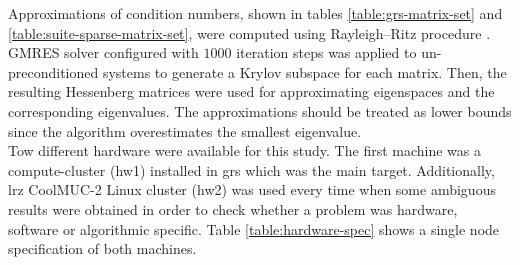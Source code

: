 Approximations of condition numbers, shown in tables \ref{table:grs-matrix-set} and \ref{table:suite-sparse-matrix-set},  were computed using Rayleigh–Ritz procedure \cite{rayleigh-ritz-procedure}. GMRES solver configured with $1000$ iteration steps was applied to un-preconditioned systems to generate a Krylov subspace for each matrix. Then, the resulting Hessenberg matrices were used for approximating eigenspaces and the corresponding eigenvalues. The approximations should be treated as lower bounds since the algorithm overestimates the smallest eigenvalue.\\




Tow different hardware were available for this study. The first machine was a compute-cluster (\gls{hw1}) installed in \gls{grs} which was the main target. Additionally, \gls{lrz} CoolMUC-2 Linux cluster (\gls{hw2}) was used every time when some ambiguous results were obtained in order to check whether a problem was hardware, software or algorithmic specific. Table \ref{table:hardware-spec} shows a single node specification of both machines.\\


